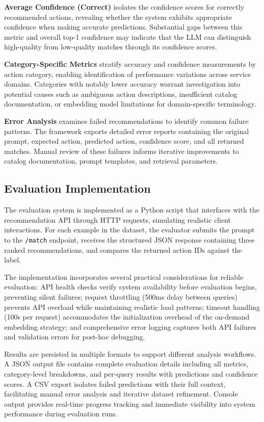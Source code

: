 \textbf{Average Confidence (Correct)} isolates the confidence scores for correctly recommended actions, revealing whether the system exhibits appropriate confidence when making accurate predictions. Substantial gaps between this metric and overall top-1 confidence may indicate that the LLM can distinguish high-quality from low-quality matches through its confidence scores.

\textbf{Category-Specific Metrics} stratify accuracy and confidence measurements by action category, enabling identification of performance variations across service domains. Categories with notably lower accuracy warrant investigation into potential causes such as ambiguous action descriptions, insufficient catalog documentation, or embedding model limitations for domain-specific terminology.

\textbf{Error Analysis} examines failed recommendations to identify common failure patterns. The framework exports detailed error reports containing the original prompt, expected action, predicted action, confidence score, and all returned matches. Manual review of these failures informs iterative improvements to catalog documentation, prompt templates, and retrieval parameters.

\subsection{Evaluation Implementation}
The evaluation system is implemented as a Python script that interfaces with the recommendation API through HTTP requests, simulating realistic client interactions. For each example in the dataset, the evaluator submits the prompt to the \texttt{/match} endpoint, receives the structured JSON response containing three ranked recommendations, and compares the returned action IDs against the label.

The implementation incorporates several practical considerations for reliable evaluation: API health checks verify system availability before evaluation begins, preventing silent failures; request throttling (500ms delay between queries) prevents API overload while maintaining realistic load patterns; timeout handling (100s per request) accommodates the initialization overhead of the on-demand embedding strategy; and comprehensive error logging captures both API failures and validation errors for post-hoc debugging.

Results are persisted in multiple formats to support different analysis workflows. A JSON output file contains complete evaluation details including all metrics, category-level breakdowns, and per-query results with predictions and confidence scores. A CSV export isolates failed predictions with their full context, facilitating manual error analysis and iterative dataset refinement. Console output provides real-time progress tracking and immediate visibility into system performance during evaluation runs.

